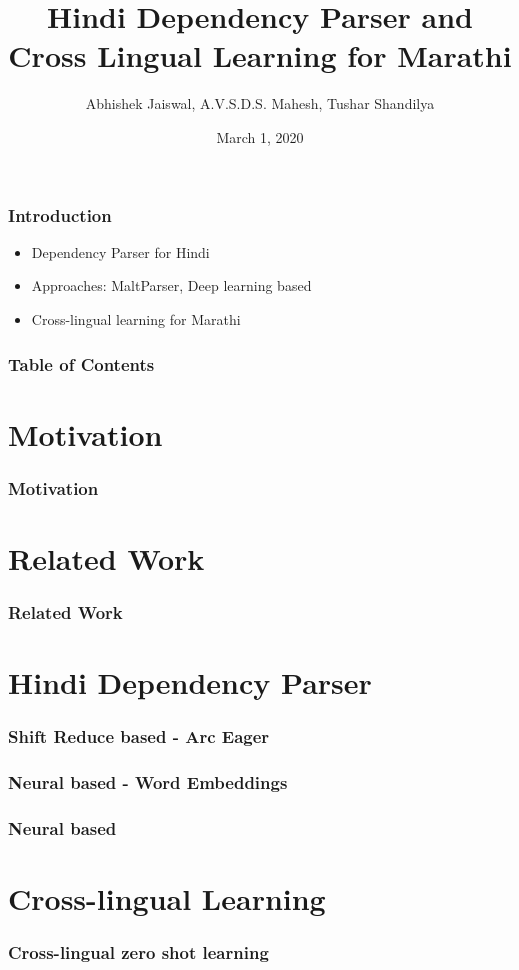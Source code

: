 \documentclass[11pt]{beamer}
\title[Hindi Dependency Parser]{Hindi Dependency Parser and Cross Lingual Learning for Marathi}
\author[Abhishek,Mahesh,Tushar]{Abhishek Jaiswal, A.V.S.D.S. Mahesh, Tushar Shandilya}
\institute[IIT Kanpur]{Indian Institute of Technology Kanpur}
\date{March 1, 2020}
\begin{document}
\begin{frame}
\maketitle
\end{frame}


\begin{frame}
\frametitle{Introduction}
\begin{itemize}
\item<1-> Dependency Parser for Hindi
\item<2-> Approaches: MaltParser, Deep learning based
\item<3-> Cross-lingual learning for Marathi
\end{itemize}
\end{frame}

\begin{frame}
\frametitle{Table of Contents}
\tableofcontents
\end{frame}
\section{Motivation}
\begin{frame}
\frametitle{Motivation}
\end{frame}
\section{Related Work}
\begin{frame}
\frametitle{Related Work}
\end{frame}
\section{Hindi Dependency Parser}
\begin{frame}
\frametitle{Shift Reduce based - Arc Eager}
\end{frame}

\begin{frame}
\frametitle{Neural based - Word Embeddings}
\end{frame}

\begin{frame}
\frametitle{Neural based}
\end{frame}


\section{Cross-lingual Learning}
\begin{frame}
\frametitle{Cross-lingual zero shot learning}
\end{frame}
\end{document}
